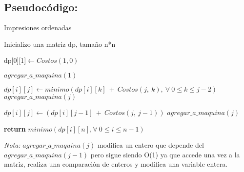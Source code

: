 \subsection{Pseudocódigo:}

\begin{algorithm}
\caption{Impresiones ordenadas}\label{ej1}
\begin{algorithmic}[1]
	\State Inicializo una matriz dp, tamaño n*n
	
	\State dp[0][1]$\gets Costos(1,0)$ 
	
	\State $agregar\_a\_maquina(1)$ 
	
	 
				\State $dp[i][j]\gets minimo(dp[i][k]\ +\ Costos(j,\ k),\ \forall\ 0\leq k\leq j-2) $ 
				\State $agregar\_a\_maquina(j)$ 
				
			\Else
				\State $dp[i][j]\gets (dp[i][j-1]\ +\ Costos(j,\ j-1))$
				\State $agregar\_a\_maquina(j)$
			\EndIf
		\EndFor
	\EndFor
	
	\State \textbf{return} $minimo(dp[i][n], \forall\ 0\leq i\leq n-1)$ 
	\State {}
\EndProcedure
\end{algorithmic}
\end{algorithm}

\textit{Nota:} $agregar\_a\_maquina(j)$ modifica un entero que depende del $agregar\_a\_maquina(j-1)$ pero sigue siendo O(1) ya que accede una vez a la matriz, realiza una comparación de enteros y modifica una variable entera.\\